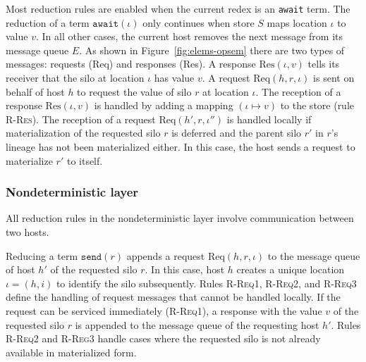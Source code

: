 \documentclass[preprint]{sigplanconf}
\theoremstyle{definition}
\theoremstyle{definition}
\begin{document}
Most reduction rules are enabled when the current redex is an \texttt{await} term. The reduction of a term $\texttt{await}(\iota)$ only continues when store $S$ maps location $\iota$ to value $v$. In all other cases, the current host removes the next message from its message queue $E$. As shown in Figure~\ref{fig:elems-opsem} there are two types of messages: requests (Req) and responses (Res). A response $\text{Res}(\iota, v)$ tells its receiver that the silo at location $\iota$ has value $v$. A request $\text{Req}(h, r, \iota)$ is sent on behalf of host $h$ to request the value of silo $r$ at location $\iota$. The reception of a response $\text{Res}(\iota, v)$ is handled by adding a mapping $(\iota \mapsto v)$ to the store (rule \textsc{R-Res}). The reception of a request $\text{Req}(h', r, \iota'')$ is handled locally if materialization of the requested silo $r$ is deferred and the parent silo $r'$ in $r$'s lineage has not been materialized either. In this case, the host sends a request to materialize $r'$ to itself.

\subsubsection{Nondeterministic layer}\label{sec:nondet-layer}

All reduction rules in the nondeterministic layer involve communication between two hosts.

Reducing a term $\texttt{send}(r)$ appends a request $\text{Req}(h, r, \iota)$ to the message queue of host $h'$ of the requested silo $r$. In this case, host $h$ creates a unique location $\iota = (h, i)$ to identify the silo subsequently. Rules \textsc{R-Req1}, \textsc{R-Req2}, and \textsc{R-Req3} define the handling of request messages that cannot be handled locally. If the request can be serviced immediately (\textsc{R-Req1}), a response with the value $v$ of the requested silo $r$ is appended to the message queue of the requesting host $h'$. Rules \textsc{R-Req2} and \textsc{R-Reg3} handle cases where the requested silo is not already available in materialized form.
\end{document}
